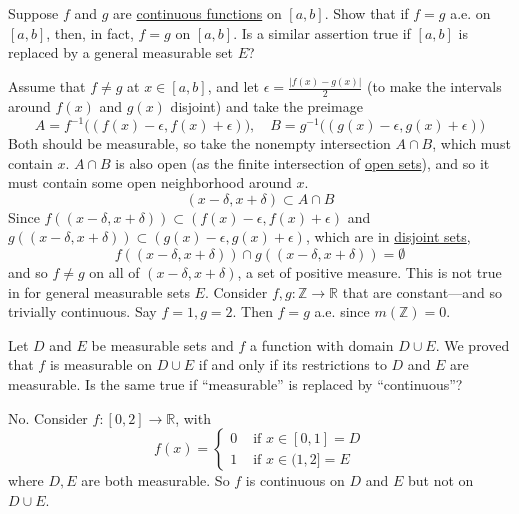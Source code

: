   \begin{exercise}[Royden 3.1]
    Suppose $f$ and $g$ are \hyperref[pst-def:continuous_func]{continuous functions} on $[a, b]$. Show that if $f = g$ a.e. on $[a, b]$, then, in fact, $f = g$ on $[a, b]$. Is a similar assertion true if $[a, b]$ is replaced by a general measurable set $E$?
  \end{exercise}
  \begin{solution}
    Assume that $f \neq g$ at $x \in [a, b]$, and let $\epsilon = \frac{|f(x) - g(x)|}{2}$ (to make the intervals around $f(x)$ and $g(x)$ disjoint) and take the preimage 
    \begin{equation}
      A = f^{-1} \big( (f(x) - \epsilon, f(x) + \epsilon)\big), \quad B = g^{-1} \big( (g(x) - \epsilon, g(x) + \epsilon)\big) 
    \end{equation}
    Both should be measurable, so take the nonempty intersection $A \cap B$, which must contain $x$. $A \cap B$ is also open (as the finite intersection of \hyperref[pst-def:open-set]{open sets}), and so it must contain some open neighborhood around $x$. 
    \begin{equation}
      (x - \delta, x + \delta) \subset A \cap B
    \end{equation}
    Since $f((x - \delta, x + \delta)) \subset (f(x) - \epsilon, f(x) + \epsilon)$ and $g((x - \delta, x + \delta)) \subset (g(x) - \epsilon, g(x) + \epsilon)$, which are in \hyperref[st-def:disjoint-sets]{disjoint sets}, 
    \begin{equation}
      f((x - \delta, x + \delta)) \cap g((x - \delta, x + \delta)) = \emptyset
    \end{equation} 
    and so $f \neq g$ on all of $(x - \delta, x + \delta)$, a set of positive measure. This is not true in for general measurable sets $E$.  Consider $f, g: \mathbb{Z} \to \mathbb{R}$ that are constant---and so trivially continuous. Say $f = 1, g = 2$. Then $f = g$ a.e. since $m(\mathbb{Z}) = 0$. 
  \end{solution}

  \begin{exercise}[Royden 3.2][ex:royden3.2]
    Let $D$ and $E$ be measurable sets and $f$ a function with domain $D \cup E$. We proved that $f$ is measurable on $D \cup E$ if and only if its restrictions to $D$ and $E$ are measurable. Is the same true if ``measurable'' is replaced by ``continuous''?
  \end{exercise}
  \begin{solution}
    No. Consider $f: [0, 2] \to \mathbb{R}$, with 
    \begin{equation}
      f(x) = \begin{cases} 
        0 & \text{ if } x \in [0, 1] = D \\  
        1 & \text{ if } x \in (1, 2] = E 
      \end{cases} 
    \end{equation}
    where $D, E$ are both measurable. So $f$ is continuous on $D$ and $E$ but not on $D \cup E$. 
  \end{solution}

